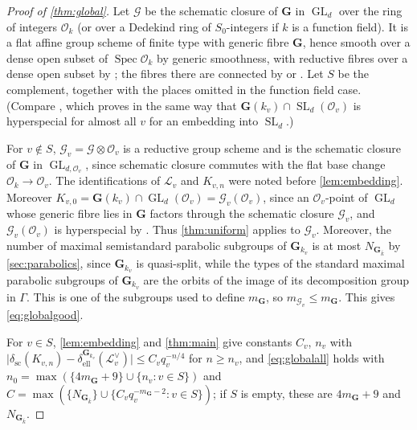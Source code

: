 \documentclass[11pt,reqno]{amsart}
\numberwithin{equation}{section}
\theoremstyle{plain}
\theoremstyle{definition}
\theoremstyle{remark}
\theoremstyle{plain}
\newcommand{\OO}{\mathcal{O}}    %
\newcommand{\Lat}{\mathcal{L}}   %
\newcommand{\bG}{\mathbf{G}}     %
\newcommand{\g}{\mathfrak{g}}    %
\newcommand{\scd}[1]{\delta_{\mathrm{sc}}(#1)}
\newcommand{\elld}[2][]{\delta_{\mathrm{ell}}^{#1}(#2)}  %
\newcommand{\cG}{\mathcal{G}}                   %
\newcommand{\abs}[1]{\lvert#1\rvert}
\DeclareMathOperator{\GL}{GL}
\DeclareMathOperator{\SL}{SL}
\DeclareMathOperator{\Spec}{Spec}
\begin{document}
\begin{proof}[Proof of \cref{thm:global}]
Let $\cG$ be the schematic closure of $\bG$ in $\GL_d$ over the ring of
integers $\OO_k$ (or over a Dedekind ring of $S_0$-integers if $k$ is a
function field). It is a flat affine group scheme of finite type with
generic fibre $\bG$, hence smooth over a dense open subset of
$\Spec\OO_k$ by generic smoothness, with reductive fibres
over a dense open subset by \cite[Proposition~3.1.9]{MR3362641}; the
fibres there are connected by \cite[Proposition~3.1.12]{MR3362641} or
\cite[Proposition~A.8.2]{MR4520154}. Let $S$ be the complement,
together with the places omitted in the function field case. (Compare
\cite[Proposition~18.1.8]{MR4520154}, which proves in the same way that
$\bG(k_v)\cap\SL_d(\OO_v)$ is hyperspecial for almost all $v$ for an
embedding into $\SL_d$.)

For $v\notin S$, $\cG_v=\cG\otimes\OO_v$ is a reductive group scheme
and is the schematic closure of $\bG$ in $\GL_{d,\OO_v}$, since
schematic closure commutes with the flat base change $\OO_k\to\OO_v$.
The identifications of $\Lat_v$ and $K_{v,n}$ were noted before
\cref{lem:embedding}. Moreover $K_{v,0}=\bG(k_v)\cap\GL_d(\OO_v)=\cG_v(\OO_v)$,
since an $\OO_v$-point of $\GL_d$ whose generic fibre lies in $\bG$ factors
through the schematic closure $\cG_v$, and $\cG_v(\OO_v)$ is hyperspecial by
\cite[Theorem~9.9.3]{MR4520154}. Thus \cref{thm:uniform} applies to $\cG_v$.
Moreover,
the number of maximal semistandard parabolic subgroups of $\bG_{k_v}$ is at
most $N_{\bG_{\bar k}}$ by \cref{sec:parabolics}, since $\bG_{k_v}$ is quasi-split, while the types of the
standard maximal parabolic subgroups of $\bG_{k_v}$ are the orbits
of the image of its decomposition group in $\Gamma$. This is one of
the subgroups used to define $m_{\bG}$, so
$m_{\cG_v}\le m_{\bG}$. This gives
\eqref{eq:globalgood}.

For $v\in S$, \cref{lem:embedding} and
\cref{thm:main} give constants $C_v$, $n_v$ with
$\abs{\scd{K_{v,n}}-\elld[\bG_{k_v}]{\Lat_v^\vee}}\le C_vq_v^{-n/4}$ for
$n\ge n_v$, and \eqref{eq:globalall} holds with
$n_0=\max(\{4m_{\bG}+9\}\cup\{n_v:v\in S\})$ and
$C=\max(\{N_{\bG_{\bar k}}\}\cup\{C_vq_v^{-m_{\bG}-2}:v\in S\})$; if $S$ is
empty, these are $4m_{\bG}+9$ and $N_{\bG_{\bar k}}$.
\end{proof}
\end{document}
